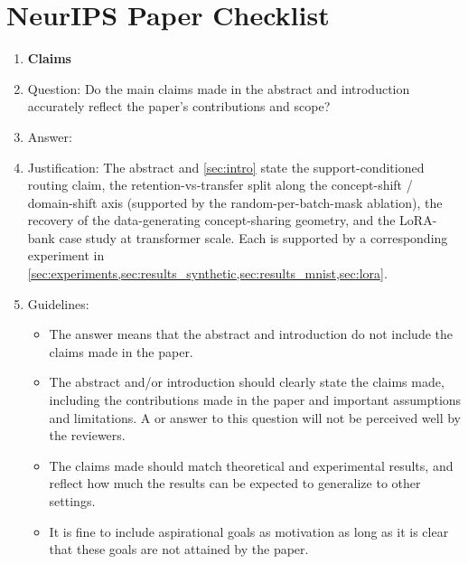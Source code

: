 \section*{NeurIPS Paper Checklist}

\begin{enumerate}

\item {\bf Claims}
    \item[] Question: Do the main claims made in the abstract and introduction accurately reflect the paper's contributions and scope?
    \item[] Answer: \answerYes{}
    \item[] Justification: The abstract and \cref{sec:intro} state the support-conditioned routing claim, the retention-vs-transfer split along the concept-shift / domain-shift axis (supported by the random-per-batch-mask ablation), the recovery of the data-generating concept-sharing geometry, and the LoRA-bank case study at transformer scale. Each is supported by a corresponding experiment in \cref{sec:experiments,sec:results_synthetic,sec:results_mnist,sec:lora}.
    \item[] Guidelines:
    \begin{itemize}
        \item The answer \answerNA{} means that the abstract and introduction do not include the claims made in the paper.
        \item The abstract and/or introduction should clearly state the claims made, including the contributions made in the paper and important assumptions and limitations. A \answerNo{} or \answerNA{} answer to this question will not be perceived well by the reviewers.
        \item The claims made should match theoretical and experimental results, and reflect how much the results can be expected to generalize to other settings.
        \item It is fine to include aspirational goals as motivation as long as it is clear that these goals are not attained by the paper.
    \end{itemize}


\end{enumerate}
